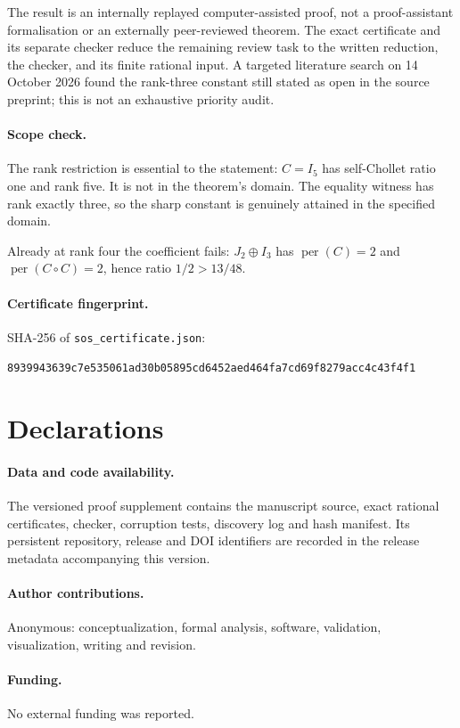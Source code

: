 \documentclass[11pt,a4paper]{article}
\newcommand{\per}{\operatorname{per}}
\theoremstyle{remark}\newtheorem{remark}[theorem]{Remark}
\begin{document}
The result is an internally replayed computer-assisted proof, not a proof-assistant formalisation or an externally peer-reviewed theorem. The exact certificate and its separate checker reduce the remaining review task to the written reduction, the checker, and its finite rational input. A targeted literature search on 14 October 2026 found the rank-three constant still stated as open in the source preprint; this is not an exhaustive priority audit.

\paragraph{Scope check.} The rank restriction is essential to the statement: $C=I_5$ has self-Chollet ratio one and rank five. It is not in the theorem's domain. The equality witness has rank exactly three, so the sharp constant is genuinely attained in the specified domain.

Already at rank four the coefficient fails: $J_2\oplus I_3$ has $\per(C)=2$ and $\per(C\circ C)=2$, hence ratio $1/2>13/48$.

\paragraph{Certificate fingerprint.} SHA-256 of \nolinkurl{sos_certificate.json}:\par
\smallskip\noindent\texttt{8939943639c7e535061ad30b05895cd6452aed464fa7cd69f8279acc4c43f4f1}

\section*{Declarations}
\paragraph{Data and code availability.} The versioned proof supplement contains the manuscript source, exact rational certificates, checker, corruption tests, discovery log and hash manifest. Its persistent repository, release and DOI identifiers are recorded in the release metadata accompanying this version.
\paragraph{Author contributions.} Anonymous: conceptualization, formal analysis, software, validation, visualization, writing and revision.
\paragraph{Funding.} No external funding was reported.
\end{document}
